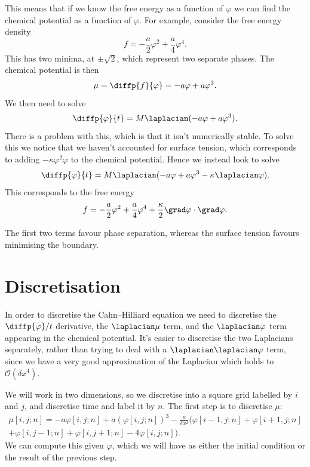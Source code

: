 \documentclass[fleqn]{NotesClass}
\newcommand*{\order}{\mathcal{O}}
\begin{document}
    This means that if we know the free energy as a function of \(\varphi\) we can find the chemical potential as a function of \(\varphi\).
    For example, consider the free energy density
    \begin{equation}
        f = -\frac{a}{2}\varphi^2 + \frac{a}{4}\varphi^4.
    \end{equation}
    This has two minima, at \(\pm\sqrt{2}\), which represent two separate phases.
    The chemical potential is then
    \begin{equation}
        \mu = \diffp{f}{\varphi} = -a\varphi + a\varphi^3.
    \end{equation}
    We then need to solve
    \begin{equation}
        \diffp{\varphi}{t} = M\laplacian(-a\varphi + a\varphi^3).
    \end{equation}
    There is a problem with this, which is that it isn't numerically stable.
    To solve this we notice that we haven't accounted for surface tension, which corresponds to adding \(-\kappa \varphi^2\varphi\) to the chemical potential.
    Hence we instead look to solve
    \begin{equation}
        \diffp{\varphi}{t} = M\laplacian (-a\varphi + a\varphi^3 - \kappa\laplacian\varphi).
    \end{equation}
    This corresponds to the free energy
    \begin{equation}
        f = -\frac{a}{2}\varphi^2 + \frac{a}{4}\varphi^4 + \frac{\kappa}{2}\grad\varphi \cdot \grad\varphi.
    \end{equation}
    
    The first two terms favour phase separation, whereas the surface tension favours minimising the boundary.
    
    \section{Discretisation}
    In order to discretise the Cahn--Hilliard equation we need to discretise the \(\diffp{\varphi}/{t}\) derivative, the \(\laplacian\mu\) term, and the \(\laplacian\varphi\) term appearing in the chemical potential.
    It's easier to discretise the two Laplacians separately, rather than trying to deal with a \(\laplacian\laplacian\varphi\) term, since we have a very good approximation of the Laplacian which holds to \(\order(\delta x^4)\).
    
    We will work in two dimensions, so we discretise into a square grid labelled by \(i\) and \(j\), and discretise time and label it by \(n\).
    The first step is to discretise \(\mu\):
    \begin{multline}
        \mu[i, j; n] = -a\varphi[i, j; n] + a(\varphi[i, j; n])^3 - \frac{\kappa}{\delta x^2}(\varphi[i - 1, j; n] + \varphi[i + 1, j; n]\\
        + \varphi[i, j - 1; n] + \varphi[i, j + 1; n] - 4\varphi[i, j; n]).
    \end{multline}
    We can compute this given \(\varphi\), which we will have as either the initial condition or the result of the previous step.
    
\end{document}
